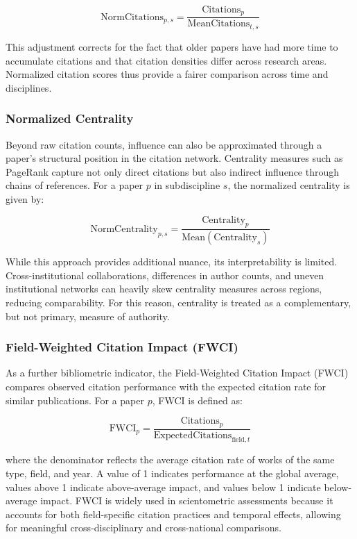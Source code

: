 \documentclass{article}
\begin{document}
\begin{equation}
	\text{NormCitations}_{p,s} = 
	\frac{
		\text{Citations}_{p}
	}{
		\text{MeanCitations}_{t,s}
	}
\end{equation}

This adjustment corrects for the fact that older papers have had more time to accumulate citations and that citation densities differ across research areas. Normalized citation scores thus provide a fairer comparison across time and disciplines.


\subsubsection{Normalized Centrality}

Beyond raw citation counts, influence can also be approximated through a paper’s structural position in the citation network. Centrality measures such as PageRank capture not only direct citations but also indirect influence through chains of references. For a paper \(p\) in subdiscipline \(s\), the normalized centrality is given by:

\begin{equation}
	\text{NormCentrality}_{p,s} = 
	\frac{\text{Centrality}_{p}}
	{\text{Mean}(\text{Centrality}_{s})}
\end{equation}


While this approach provides additional nuance, its interpretability is limited. Cross-institutional collaborations, differences in author counts, and uneven institutional networks can heavily skew centrality measures across regions, reducing comparability. For this reason, centrality is treated as a complementary, but not primary, measure of authority.


\subsubsection{Field-Weighted Citation Impact (FWCI)}

As a further bibliometric indicator, the Field-Weighted Citation Impact (FWCI) compares observed citation performance with the expected citation rate for similar publications. For a paper \(p\), FWCI is defined as:

\begin{equation}
	\text{FWCI}_{p} =
	\frac{
		\text{Citations}_{p}
	}{
		\text{ExpectedCitations}_{\text{field},t}
	}
\end{equation}

where the denominator reflects the average citation rate of works of the same type, field, and year. A value of 1 indicates performance at the global average, values above 1 indicate above-average impact, and values below 1 indicate below-average impact. FWCI is widely used in scientometric assessments because it accounts for both field-specific citation practices and temporal effects, allowing for meaningful cross-disciplinary and cross-national comparisons.
\end{document}
